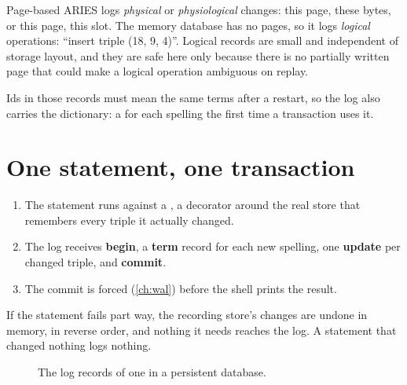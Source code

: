 Page-based ARIES logs \emph{physical} or \emph{physiological} changes: this page,
these bytes, or this page, this slot. The memory database has no pages, so it
logs \emph{logical} operations: ``insert triple (18, 9, 4)''. Logical records are
small and independent of storage layout, and they are safe here only because
there is no partially written page that could make a logical operation
ambiguous on replay.

Ids in those records must mean the same terms after a restart, so the log also
carries the dictionary: a  for each spelling the first time a
transaction uses it.

\section{One statement, one transaction}

\begin{enumerate}
\item The statement runs against a , a decorator around the real store that remembers every triple it actually changed.
\item The log receives \textbf{begin}, a \textbf{term} record for each new spelling, one \textbf{update} per changed triple, and \textbf{commit}.
\item The commit is forced (\cref{ch:wal}) before the shell prints the result.
\end{enumerate}

If the statement fails part way, the recording store's changes are undone in
memory, in reverse order, and nothing it needs reaches the log. A statement that
changed nothing logs nothing.

\begin{figure}[ht]
\centering
{}
\caption{The log records of one  in a persistent database.}
\end{figure}

